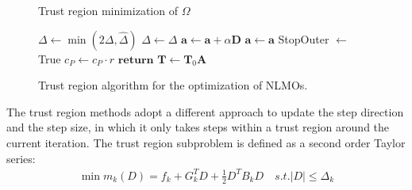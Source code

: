 \documentclass[aps,prl,reprint,amsmath,amssymb]{revtex4-1}
\begin{document}
\begin{figure}
\addtocounter{algorithm}{-1}
\begin{algorithm}[H]
\caption{Trust region minimization of $\Omega$}
   \begin{algorithmic}[1]
                       \State $\Delta \gets \min{(2\Delta, \hat{\Delta})}$
                     \Else
                        \State $\Delta \gets \Delta$ 
                     \EndIf
                 \EndIf
                 \If{$\rho > \eta$}
                    \State $\mathbf{a}\gets \mathbf{a} + \alpha \mathbf{D}$ 
                  \Else
                     \State $\mathbf{a}\gets  \mathbf{a}$ 
                 \EndIf
			\EndIf
			\State StopOuter $\gets$ True
		\EndIf
			\State $c_{P} \gets c_P \cdot r$ 
		\EndIf
	\State $\mathbf{return}$ $\mathbf{T} \gets \mathbf{T}_0 \mathbf{A} $ 
   \end{algorithmic}
\end{algorithm}
\caption{\label{fig:tr} Trust region algorithm for the optimization of NLMOs.}
\end{figure}
The trust region methods adopt a different approach to update the step direction and the step size, in which it only takes steps within a trust region around the current iteration. The trust region subproblem  is defined as a second order Taylor series:
%
\begin{equation} \label{eq:tr_subproblem}
\begin{split}
\min m_{k}(D) = f_{k} + G_{k}^T D + \frac{1}{2}D^T B_{k}D    \quad s.t. \lvert D \rvert \leq \Delta_{k}
\end{split}
\end{equation}
%
\end{document}
